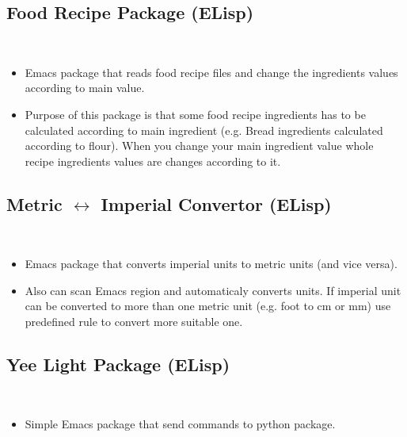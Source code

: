 \documentclass[a4paper, 9pt]{extarticle}
\begin{document}
\subsection{Food Recipe Package (ELisp)} \label{lisp:frp} \hfill \\
\begin{itemize}
	\item Emacs package that reads food recipe files and change the ingredients
	values according to main value.
	\item Purpose of this package is that some food recipe ingredients has to be
	calculated according to main ingredient
	(e.g. Bread ingredients calculated according to flour). When you change your
	main ingredient value whole recipe ingredients values are changes according
	to it.
\end{itemize}


\subsection{Metric $\longleftrightarrow$ Imperial Convertor (ELisp)} \hfill \\
\begin{itemize}
	\item Emacs package that converts imperial units to metric units
	(and vice versa).
	\item Also can scan Emacs region and automaticaly converts units. If imperial
	unit can be converted to more than one metric unit (e.g. foot to cm or mm)
	use predefined rule to convert more suitable one.
\end{itemize}


\subsection{Yee Light Package (ELisp)} \hfill \\
\begin{itemize}
	\item Simple Emacs package that send commands to  python
		package.
\end{itemize}
\end{document}

